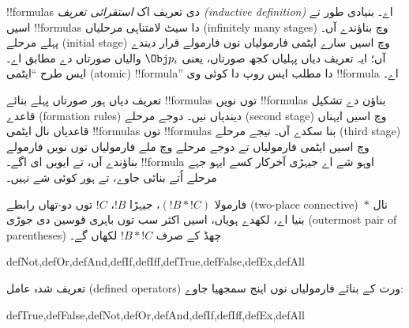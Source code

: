 \documentclass[../../../include/open-logic-section]{subfiles}
\begin{document}
\begin{explain}
!!{formula}s دی تعریف اک \emph{استقرائی تعریف (inductive definition)}
اے۔ بنیادی طور تے اسیں !!{formula}s دا سیٹ لامتناہی مرحلیاں (infinitely
many stages) وچ بناؤندے آں۔ پہلے مرحلے (initial stage) وچ اسیں سارے
ایٹمی
فارمولیاں نوں فارمولے قرار دیندے آں؛ ایہ تعریف دیاں پہلیاں کجھ صورتاں،
یعنی
%
%
$\Obj p_i$ والیاں صورتاں دے مطابق اے۔ ایس طرح ``ایٹمی (atomic)
!!{formula}''
دا مطلب ایس روپ دا کوئی وی !!{formula} اے۔

تعریف دیاں ہور صورتاں پہلے بنائے !!{formula}s توں نویں !!{formula}s
بناؤن دے تشکیل قاعدے (formation rules) دیندیاں نیں۔ دوجے مرحلے (second
stage) وچ اسیں ایہناں قاعدیاں نال ایٹمی
!!{formula}s توں !!{formula}s بنا سکدے آں۔ تیجے مرحلے (third stage)
وچ اسیں ایٹمی
فارمولیاں تے دوجے مرحلے وچ ملے فارمولیاں توں نویں فارمولے بناؤندے آں،
تے ایویں ای اگے۔ !!{formula} اوہو شے اے جیہڑی آخرکار کسے ایہو جہے
مرحلے اُتے بنائی جاوے، تے ہور کوئی شے نہیں۔
\end{explain}

فارمولا $(!B \ast !C)$، جیہڑا $!B$، $!C$ توں دو-تھاں رابطے
(two-place connective)~$\ast$ نال بنیا اے، لکھدے ہویاں، اسیں اکثر سب
توں باہری قوسین دی جوڑی (outermost pair of parentheses) چھڈ کے صرف
$!B \ast !C$ لکھاں گے۔

\begin{tagblock}{defNot,defOr,defAnd,defIf,defIff,defTrue,defFalse,defEx,defAll}
\begin{defn}
تعریف شدہ عامل (defined operators) ورت کے بنائے فارمولیاں نوں اینج
سمجھیا جاوے:

\begin{tagenumerate}{defTrue,defFalse,defNot,defOr,defAnd,defIf,defIff,defEx,defAll}







\end{tagenumerate}
\end{defn}
\end{tagblock}
\end{document}
